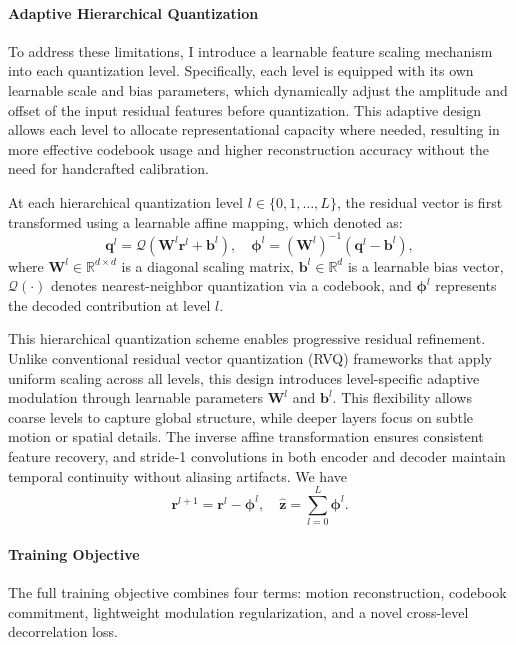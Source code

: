 \documentclass[a4paper,12pt]{article}
\begin{document}
\paragraph{Adaptive Hierarchical Quantization}
To address these limitations, I introduce a learnable feature scaling mechanism into each quantization level. Specifically, each level is equipped with its own learnable scale and bias parameters, which dynamically adjust the amplitude and offset of the input residual features before quantization. This adaptive design allows each level to allocate representational capacity where needed, resulting in more effective codebook usage and higher reconstruction accuracy without the need for handcrafted calibration.


At each hierarchical quantization level \( l \in \{0, 1, \ldots, L\} \), the residual vector is first transformed using a learnable affine mapping, which denoted as:
\begin{equation}
\mathbf{q}^l = \mathcal{Q}(\mathbf{W}^l \mathbf{r}^l + \mathbf{b}^l), \quad 
\boldsymbol{\phi}^l = (\mathbf{W}^l)^{-1} (\mathbf{q}^l - \mathbf{b}^l),
\end{equation}
where \( \mathbf{W}^l \in \mathbb{R}^{d \times d} \) is a diagonal scaling matrix, \( \mathbf{b}^l \in \mathbb{R}^d \) is a learnable bias vector, \( \mathcal{Q}(\cdot) \) denotes nearest-neighbor quantization via a codebook, and \( \boldsymbol{\phi}^l \) represents the decoded contribution at level \( l \).


This hierarchical quantization scheme enables progressive residual refinement. Unlike conventional residual vector quantization (RVQ) frameworks that apply uniform scaling across all levels, this design introduces level-specific adaptive modulation through learnable parameters \( \mathbf{W}^l \) and \( \mathbf{b}^l \). This flexibility allows coarse levels to capture global structure, while deeper layers focus on subtle motion or spatial details. The inverse affine transformation ensures consistent feature recovery, and stride-1 convolutions in both encoder and decoder maintain temporal continuity without aliasing artifacts. We have
\begin{equation}
\mathbf{r}^{l+1} = \mathbf{r}^l - \boldsymbol{\phi}^l, \quad
\hat{\mathbf{z}} = \sum_{l=0}^{L} \boldsymbol{\phi}^l.
\end{equation}


\paragraph{Training Objective}
The full training objective combines four terms: motion reconstruction, codebook commitment, lightweight modulation regularization, and a novel cross-level decorrelation loss.
\end{document}
